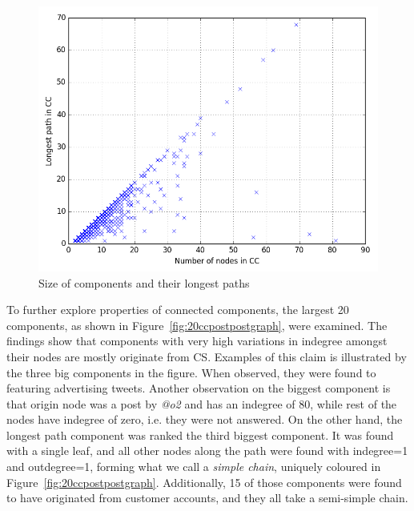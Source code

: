 \documentclass[sigconf]{acmart}
\begin{document}
{\begin{figure}[htb]
\centering
\includegraphics[width=\columnwidth]{images/ccsizepaths.png}
\caption{Size of components and their longest paths}
\label{fig:ccsizepaths}
\end{figure}

To further explore properties of connected components, the largest 20
components, as shown in Figure~\ref{fig:20ccpostpostgraph}, were
examined.  The findings show that components with very high variations
in indegree amongst their nodes are mostly originate from CS. Examples
of this claim is illustrated by the three big components in the
figure. When observed, they were found to featuring advertising
tweets. Another observation on the biggest component is that origin
node was a post by {\emph{@o2}} and has an indegree of 80, while rest
of the nodes have indegree of zero, i.e. they were not answered. On
the other hand, the longest path component was ranked the third
biggest component. It was found with a single leaf, and all other
nodes along the path were found with indegree=1 and outdegree=1,
forming what we call a {\emph{simple chain}}, uniquely coloured in
Figure~\ref{fig:20ccpostpostgraph}. Additionally, 15 of those
components were found to have originated from customer accounts, and
they all take a semi-simple chain.

}
\end{document}
